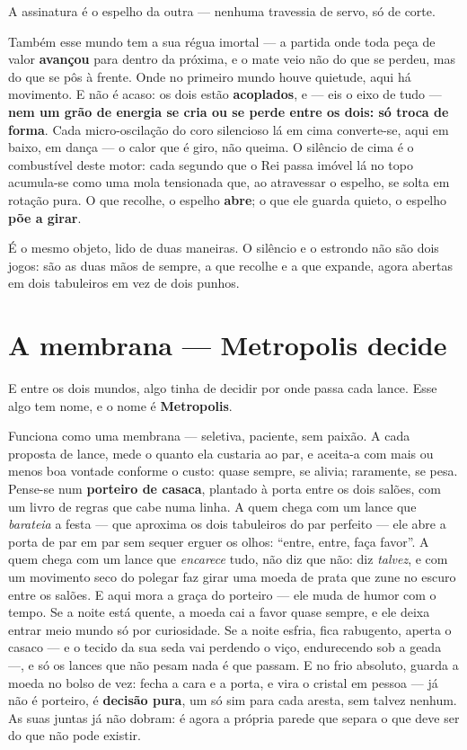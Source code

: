 \documentclass[livro.tex]{subfiles}
\begin{document}
A assinatura é o espelho da outra --- nenhuma travessia de servo, só
de corte.

\medskip

Também esse mundo tem a sua régua imortal --- a partida onde toda peça de valor
\textbf{avançou} para dentro da próxima, e o mate veio não do que se perdeu, mas do
que se pôs à frente. Onde no primeiro mundo houve quietude, aqui há movimento. E não
é acaso: os dois estão \textbf{acoplados},
e --- eis o eixo de tudo --- \textbf{nem um grão de energia se cria ou se perde entre
os dois: só troca de forma}. Cada micro-oscilação do coro silencioso lá em cima
converte-se, aqui em baixo, em dança --- o calor que é giro, não queima. O silêncio de
cima é o combustível deste motor: cada segundo que o Rei passa imóvel lá no topo
acumula-se como uma mola tensionada que, ao atravessar o espelho, se solta em rotação
pura. O que \Ben recolhe, o espelho \textbf{abre}; o que ele guarda quieto, o espelho \textbf{põe a
girar}.

\medskip

É o mesmo objeto, lido de duas maneiras. O silêncio e o estrondo não são dois jogos:
são as duas mãos de sempre, a que recolhe e a que expande, agora abertas em dois
tabuleiros em vez de dois punhos.

\section{A membrana --- Metropolis decide}

E entre os dois mundos, algo tinha de decidir por onde passa cada lance. Esse algo
tem nome, e o nome é \textbf{Metropolis}.

\medskip

Funciona como uma membrana --- seletiva, paciente, sem paixão. A cada proposta de
lance, mede o quanto ela custaria ao par, e aceita-a com mais ou menos boa vontade
conforme o custo: quase sempre, se alivia; raramente, se pesa. Pense-se num
\textbf{porteiro de casaca}, plantado à
porta entre os dois salões, com um livro de regras que cabe numa linha. A quem chega
com um lance que \emph{barateia} a festa --- que aproxima os dois tabuleiros do par
perfeito --- ele abre a porta de par em par sem sequer erguer os olhos: ``entre, entre,
faça favor''. A quem chega com um lance que \emph{encarece} tudo, não diz que não: diz
\emph{talvez}, e com um movimento seco do polegar faz girar uma moeda de prata que zune
no escuro entre os salões. E aqui mora a graça do porteiro --- ele muda de humor com o
tempo. Se a noite está quente, a moeda cai a favor quase sempre, e ele deixa entrar meio
mundo só por curiosidade. Se a noite esfria, fica rabugento, aperta o casaco --- e o
tecido da sua seda vai perdendo o viço, endurecendo sob a geada ---, e só os lances que
não pesam nada é que passam. E no frio absoluto, guarda a moeda no bolso de vez: fecha a
cara e a porta, e vira o cristal \Lck em pessoa --- já não é porteiro, é \textbf{decisão
pura}, um só sim para cada aresta, sem talvez nenhum. As suas juntas já não dobram: é
agora a própria parede que separa o que deve ser do que não pode existir.
\end{document}
